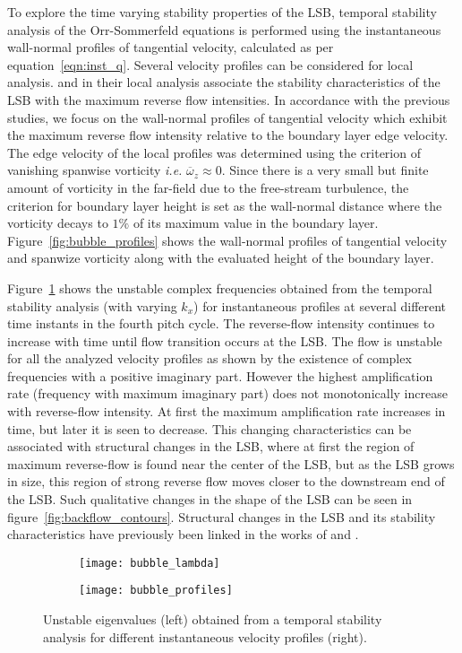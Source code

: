 To explore the time varying stability properties of the LSB, temporal stability analysis of the Orr-Sommerfeld equations is performed using the instantaneous wall-normal profiles of tangential velocity, calculated as per equation~\ref{eqn:inst_q}. Several velocity profiles can be considered for local analysis. \cite{alam00} and \cite{haggmark01b} in their local analysis associate the stability characteristics of the LSB with the maximum reverse flow intensities. In accordance with the previous studies, we focus on the wall-normal profiles of tangential velocity which exhibit the maximum reverse flow intensity relative to the boundary layer edge velocity. The edge velocity of the local profiles was determined using the criterion of vanishing spanwise vorticity \textit{i.e.} $\overline{\omega}_{z}\approx0$. Since there is a very small but finite amount of vorticity in the far-field due to the free-stream turbulence, the criterion for boundary layer height is set as the wall-normal distance where the vorticity decays to $1\%$ of its maximum value in the boundary layer. Figure~\ref{fig:bubble_profiles} shows the wall-normal profiles of tangential velocity and spanwize vorticity along with the evaluated height of the boundary layer.

Figure~\ref{fig:bubble_lambda} shows the unstable complex frequencies obtained from the temporal stability analysis (with varying $k_{x}$) for instantaneous profiles at several different time instants in the fourth pitch cycle. The reverse-flow intensity continues to increase with time until flow transition occurs at the LSB. The flow is unstable for all the analyzed velocity profiles as shown by the existence of complex frequencies with a positive imaginary part. However the highest amplification rate (frequency with maximum imaginary part) does not monotonically increase with reverse-flow intensity. At first the maximum amplification rate increases in time, but later it is seen to decrease. This changing characteristics can be associated with structural changes in the LSB, where at first the region of maximum reverse-flow is found near the center of the LSB, but as the LSB grows in size, this region of strong reverse flow moves closer to the downstream end of the LSB. Such qualitative changes in the shape of the LSB can be seen in figure~\ref{fig:backflow_contours}. Structural changes in the LSB and its stability characteristics have previously been linked in the works of \cite{theofilis00,cherubini10} and \cite{rodriquez10}. 

\begin{figure}
	\centering
	\begin{subfigure}[t]{0.48\textwidth}
		\centering
		\texttt{[image: bubble\_lambda]}
	\end{subfigure}
	\begin{subfigure}[t]{0.48\textwidth}
		\centering
		\texttt{[image: bubble\_profiles]}
	\end{subfigure}
	\caption{Unstable eigenvalues (left) obtained from a temporal stability analysis for different instantaneous velocity profiles (right).}
	\label{fig:bubble_lambda}
\end{figure}

